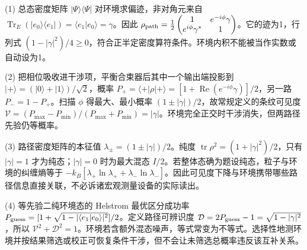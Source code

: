 (1) 总态密度矩阵 \(|\Psi\rangle\langle\Psi|\) 对环境求偏迹，非对角元来自 \(\operatorname{Tr}_E(|e_0\rangle\langle e_1|)=\langle e_1|e_0\rangle=\gamma\)。因此 \(\rho_{\rm path}=\frac12\begin{pmatrix}1&e^{-i\phi}\gamma\\e^{i\phi}\gamma^*&1\end{pmatrix}\)。它的迹为1，行列式 \((1-|\gamma|^2)/4\ge0\)，符合正半定密度算符条件。环境内积不能被当作实数或自动设为1。

(2) 把相位吸收进干涉项，平衡合束器后其中一个输出端投影到 \(|+\rangle=(|0\rangle+|1\rangle)/\sqrt2\)，概率 \(P_+=\langle+|\rho|+\rangle=[1+\operatorname{Re}(e^{-i\phi}\gamma)]/2\)，另一路 \(P_-=1-P_+\)。扫描 \(\phi\) 得最大、最小概率 \((1\pm|\gamma|)/2\)，故常规定义的条纹可见度 \(\mathcal V=(P_{\max}-P_{\min})/(P_{\max}+P_{\min})=|\gamma|\)。环境完全正交时干涉消失，但两路径先验仍等概率。

(3) 路径密度矩阵的本征值 \(\lambda_\pm=(1\pm|\gamma|)/2\)。纯度 \(\operatorname{tr}\rho^2=(1+|\gamma|^2)/2\)，只有 \(|\gamma|=1\) 才为纯态；\(|\gamma|=0\) 时为最大混态 \(I/2\)。若整体态确为题设纯态，粒子与环境的纠缠熵等于 \(-k_B[\lambda_+\ln\lambda_++\lambda_-\ln\lambda_-]\)。因此可见度下降与环境携带哪些路径信息直接关联，不必诉诸宏观测量设备的实际读出。

(4) 等先验二纯环境态的 Helstrom 最优区分成功率 \(P_{\rm guess}=[1+\sqrt{1-|\langle e_1|e_0\rangle|^2}]/2\)。定义路径可辨识度 \(\mathcal D=2P_{\rm guess}-1=\sqrt{1-|\gamma|^2}\)，所以 \(\mathcal V^2+\mathcal D^2=1\)。环境若含额外混态噪声，等式常变为不等式。选择性地测环境并按结果筛选或校正可恢复条件干涉，但不会让未筛选总概率违反该互补关系。

